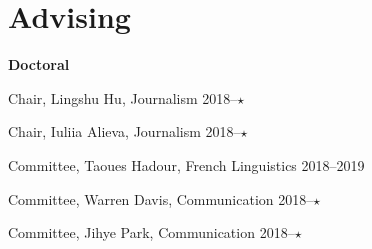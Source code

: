 
\section{Advising}

  \textbf{Doctoral}
    \begin{innerlist}
      \item Chair, Lingshu Hu, Journalism                                       \hfill 2018--$\star$
      \item Chair, Iuliia Alieva, Journalism                                    \hfill 2018--$\star$
      \item Committee, Taoues Hadour, French Linguistics                        \hfill 2018--2019
      \item Committee, Warren Davis, Communication                              \hfill 2018--$\star$
      \item Committee, Jihye Park, Communication                                \hfill 2018--$\star$
    \end{innerlist}\vspace{1em}


